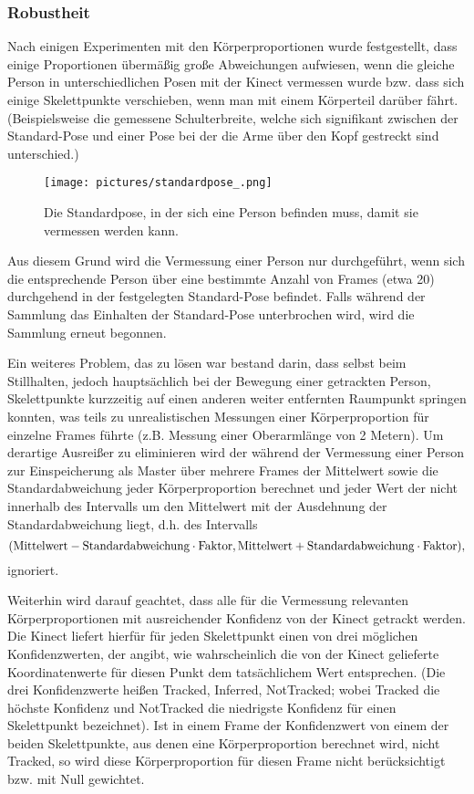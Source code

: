 \subsubsection{Robustheit}
Nach einigen Experimenten mit den Körperproportionen wurde festgestellt, dass einige Proportionen übermäßig große Abweichungen aufwiesen, wenn die gleiche Person in unterschiedlichen Posen mit der Kinect vermessen wurde bzw. dass sich einige Skelettpunkte \glqq{}verschieben\grqq{}, wenn man mit einem Körperteil darüber fährt. (Beispielsweise die gemessene Schulterbreite, welche sich signifikant zwischen der Standard-Pose und einer Pose bei der die Arme über den Kopf gestreckt sind unterschied.) 
\begin{figure}[h!]
		\centering
		\texttt{[image: pictures/standardpose\_.png]}
		\caption{Die Standardpose, in der sich eine Person befinden muss, damit sie vermessen werden kann.}\label{fig:standardp}
		\end{figure}
Aus diesem Grund wird die Vermessung einer Person nur durchgeführt, wenn sich die entsprechende Person über eine bestimmte Anzahl von Frames (etwa 20) durchgehend in der festgelegten Standard-Pose befindet. Falls während der Sammlung das Einhalten der Standard-Pose unterbrochen wird, wird die Sammlung erneut begonnen.\par
Ein weiteres Problem, das zu lösen war bestand darin, dass selbst beim Stillhalten, jedoch hauptsächlich bei der Bewegung einer getrackten Person, Skelettpunkte kurzzeitig auf einen anderen weiter entfernten Raumpunkt springen konnten, was teils zu unrealistischen Messungen einer Körperproportion für einzelne Frames führte (z.B. Messung einer Oberarmlänge von 2 Metern). Um derartige Ausreißer zu eliminieren wird der während der Vermessung einer Person zur Einspeicherung als Master über mehrere Frames der Mittelwert sowie die Standardabweichung jeder Körperproportion berechnet und jeder Wert der nicht innerhalb des Intervalls um den Mittelwert mit der Ausdehnung der Standardabweichung liegt, d.h. des Intervalls \[(\text{Mittelwert}-\text{Standardabweichung}\cdot \text{Faktor}, \text{Mittelwert}+\text{Standardabweichung}\cdot \text{Faktor})\text,\] ignoriert. 
\par
Weiterhin wird darauf geachtet, dass alle für die Vermessung relevanten Körperproportionen mit ausreichender Konfidenz von der Kinect getrackt werden. Die Kinect liefert hierfür für jeden Skelettpunkt einen von drei möglichen Konfidenzwerten, der angibt, wie wahrscheinlich die von der Kinect gelieferte Koordinatenwerte für diesen Punkt dem tatsächlichem Wert entsprechen. (Die drei Konfidenzwerte heißen Tracked, Inferred, NotTracked; wobei Tracked die höchste Konfidenz und NotTracked die niedrigste Konfidenz für einen Skelettpunkt bezeichnet). Ist in einem Frame der Konfidenzwert von einem der beiden Skelettpunkte, aus denen eine Körperproportion berechnet wird, nicht Tracked, so wird diese Körperproportion für diesen Frame nicht berücksichtigt bzw. mit Null gewichtet. \par
